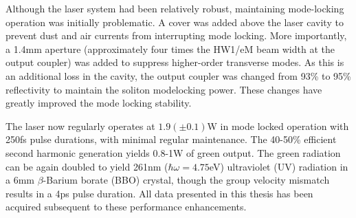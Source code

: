 Although the laser system had been relatively robust, maintaining mode-locking operation was initially problematic.
A cover was added above the laser cavity to prevent dust and air currents from interrupting mode locking.
More importantly, a 1.4mm aperture (approximately four times the HW1/eM beam width at the output coupler) was added to suppress higher-order transverse modes.
As this is an additional loss in the cavity, the output coupler was changed from 93\% to 95\% reflectivity to maintain the soliton modelocking power.
These changes have greatly improved the mode locking stability.

The laser now regularly operates at $1.9 (\pm 0.1)$W in mode locked operation with 250fs pulse durations, with minimal regular maintenance.
The 40-50\% efficient second harmonic generation yields 0.8-1W of green output.
The green radiation can be again doubled to yield 261nm ($\hbar \omega = 4.75$eV) ultraviolet (UV) radiation in a 6mm $\beta$-Barium borate (BBO) crystal, though the group velocity mismatch results in a 4ps pulse duration.
All data presented in this thesis has been acquired subsequent to these performance enhancements.


